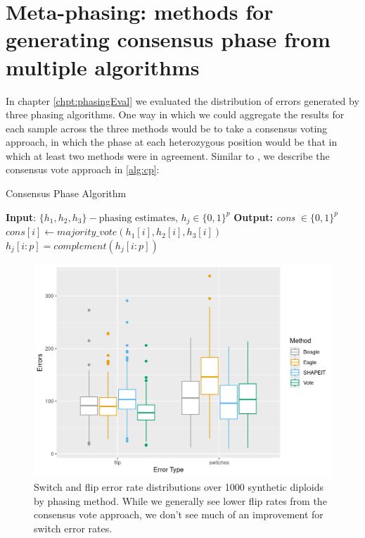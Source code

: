 \chapter{Meta-phasing: methods for generating consensus phase from multiple algorithms}
\label{chpt:metaphase}

In chapter \ref{chpt:phasingEval} we evaluated the distribution of errors generated by three phasing algorithms. One way in which we could aggregate the results for each sample across the three methods would be to take a consensus voting approach, in which the phase at each heterozygous position would be that in which at least two methods were in agreement. Similar to \citep{AlBkhetan2020}, we describe the consensus vote approach in \ref{alg:cp}:

\begin{algorithm}
\caption{Consensus Phase Algorithm}\label{alg:cp}
\begin{algorithmic}
\State \textbf{Input}:  $\{h_1, h_2, h_3\} - \textrm{phasing estimates, } h_j \in \{0,1\}^p$
\State \textbf{Output: } \textit{cons} $\in \{0,1\}^p$
\State $cons[i] \gets majority\_vote(h_1[i], h_2[i], h_3[i])$
\State $h_j[i:p] = complement(h_j[i:p])$
\EndIf
\EndFor
\EndFor
\end{algorithmic}
\end{algorithm}

\begin{figure}
    \centering
    \includegraphics[scale=0.90]{chapters/figures/vote_results.png}
    \caption{Switch and flip error rate distributions over 1000 synthetic diploids by phasing method. While we generally see lower flip rates from the consensus vote approach, we don't see much of an improvement for switch error rates.}
    \label{fig:vote}
\end{figure}

